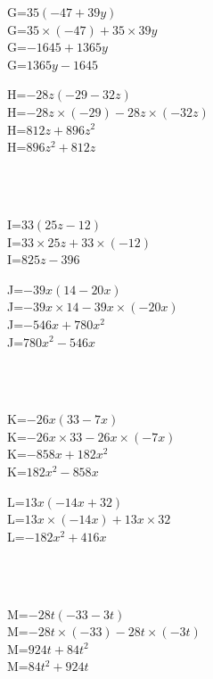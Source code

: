 \documentclass{article}%
\begin{document}
\begin{minipage}{0.5\textwidth}%
G=$35(-47+39y)$\\%
G=$35 \times (-47)+35 \times 39y$\\%
G=$-1645+1365y$\\%
G=$1365y-1645$\\%
\end{minipage}%
\begin{minipage}{0.5\textwidth}%
H=$-28z(-29-32z)$\\%
H=$-28z \times (-29)-28z \times (-32z)$\\%
H=$812z+896z^2$\\%
H=$896z^2+812z$\\%
\end{minipage}%
\\%
\\%
\begin{minipage}{0.5\textwidth}%
I=$33(25z-12)$\\%
I=$33 \times 25z+33 \times (-12)$\\%
I=$825z-396$\\%
\end{minipage}%
\begin{minipage}{0.5\textwidth}%
J=$-39x(14-20x)$\\%
J=$-39x \times 14-39x \times (-20x)$\\%
J=$-546x+780x^2$\\%
J=$780x^2-546x$\\%
\end{minipage}%
\\%
\\%
\begin{minipage}{0.5\textwidth}%
K=$-26x(33-7x)$\\%
K=$-26x \times 33-26x \times (-7x)$\\%
K=$-858x+182x^2$\\%
K=$182x^2-858x$\\%
\end{minipage}%
\begin{minipage}{0.5\textwidth}%
L=$13x(-14x+32)$\\%
L=$13x \times (-14x)+13x \times 32$\\%
L=$-182x^2+416x$\\%
\end{minipage}%
\\%
\\%
\begin{minipage}{0.5\textwidth}%
M=$-28t(-33-3t)$\\%
M=$-28t \times (-33)-28t \times (-3t)$\\%
M=$924t+84t^2$\\%
M=$84t^2+924t$\\%
\end{minipage}%
\end{document}
